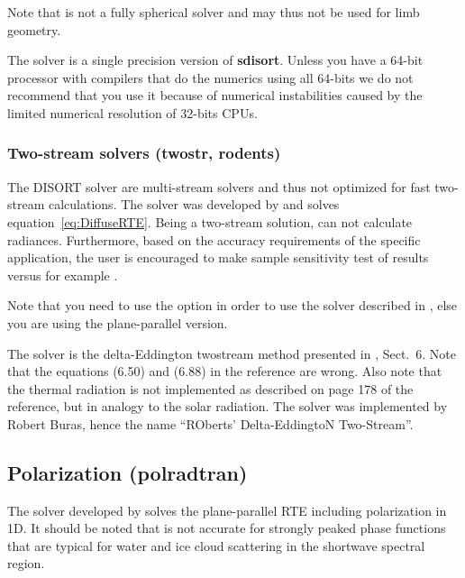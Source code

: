 Note that  is not a fully spherical solver and may thus
not be used for limb geometry.

The  solver is a single precision version of {\bf
  sdisort}. Unless you have a 64-bit processor with compilers that do
the numerics using all 64-bits we do not recommend that you use it
because of numerical instabilities caused by the limited numerical
resolution of 32-bits CPUs.



\subsubsection{Two-stream solvers (twostr, rodents)}
The DISORT solver are multi-stream solvers and thus not optimized for
fast two-stream calculations. The  solver was developed by
\citet{Kylling1995} and solves equation~\ref{eq:DiffuseRTE}. Being a
two-stream solution,  can not calculate
radiances. Furthermore, based on the accuracy requirements of the
specific application, the user is encouraged to make sample
sensitivity test of  results versus for example .

Note that you need to use the option  in order
to use the solver described in \citet{Kylling1995}, else you are using
the plane-parallel version.

The  solver is the delta-Eddington twostream method
presented in \cite{Zdunkowski2007}, Sect.~6. Note that the equations
(6.50) and (6.88) in the reference are wrong. Also note that the
thermal radiation is not implemented as described on page 178 of the
reference, but in analogy to the solar radiation. The solver was
implemented by Robert Buras, hence the name ``ROberts' Delta-EddingtoN
Two-Stream''.

\subsection{Polarization (polradtran)}
The  solver developed by \citet{Evans1991} solves the
plane-parallel RTE including polarization in 1D. It should be
noted that  is not accurate for strongly peaked phase
functions that are typical for water and ice cloud scattering in the
shortwave spectral region. 

